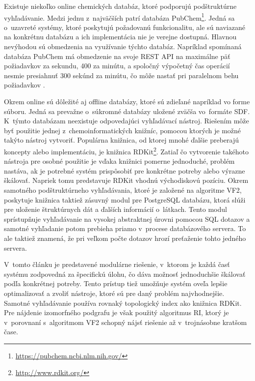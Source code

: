 \documentclass[slovak]{ExcelAtFIT} %
\begin{document}
Existuje niekoľko online chemických databáz, kto\-ré podporujú podštruktúrne vyhľadávanie. Medzi jednu z~najväčších patrí databáza PubChem\footnote{\url{https://pubchem.ncbi.nlm.nih.gov/}}. Jedná sa o~uzavreté systémy, ktoré poskytujú požadovanú funkcionalitu, ale sú naviazané na konkrétnu databázu a ich implementácia nie je verejne dostupná. Hlavnou ne\-vý\-ho\-dou sú obmedzenia na využívanie týchto databáz. Napríklad spomínaná databáza PubChem má obmedzenie na svoje REST API na maximálne päť požiadavkov za sekundu, 400 za minútu, a spoločný výpočetný čas operácií nesmie presiahnuť 300 sekúnd za minútu, čo môže nastať pri paralelnom behu po\-žia\-dav\-kov \cite{pubchem_limits}. 

Okrem online sú dôležité aj offline databázy, ktoré sú zdieľané napríklad vo forme súboru. Jedná sa pre\-va\-žne o~súkromné databázy uložené zväčša vo~formáte SDF. K~týmto databázam neexistuje odpovedajúci vy\-hľa\-dá\-va\-cí nástroj. Riešením môže byť použitie jednej z~chemoinformatických knižníc, pomocou ktorých je možné takýto nástroj vytvoriť. Populárna knižnica, od ktorej mnohé ďalšie preberajú koncepty alebo implementáciu, je knižnica RDKit\footnote{\url{http://www.rdkit.org/}}. Zatiaľ čo vytvorenie takéhoto ná\-stro\-ja pre osobné použitie je vďaka knižnici pomerne jednoduché, problém nastáva, ak je potrebné systém pri\-spô\-so\-biť pre konkrétne potreby alebo výrazne šká\-lo\-vať. Napriek tomu predstavuje RDKit vhodnú východiskovú pozíciu. Okrem samotného podštruktúrneho vy\-hľa\-dá\-va\-nia, ktoré je založené na algoritme VF2, poskytuje knižnica taktiež zásuvný modul pre PostgreSQL databázu, ktorá slúži pre uloženie štruktúrnych dát a ďalších informácií o~látkach. Tento modul sprístupňuje vy\-hľa\-dá\-va\-nie na vysokej abstraktnej úrovni pomocou SQL dotazov a samotné vyhľadanie potom prebieha priamo v~procese databázového servera. To ale taktiež znamená, že pri veľkom počte dotazov hrozí preťaženie tohto jedného servera.

V~tomto článku je predstavené modulárne riešenie, v~ktorom je každá časť systému zodpovedná za špe\-ci\-fi\-ckú úlohu, čo dáva možnosť jednoduchšie škálovať podľa konkrétnej potreby. Tento prístup tiež umožňuje systém oveľa lepšie optimalizovať a zvoliť nástroje, ktoré sú pre daný problém najvhodnejšie. Samotné vyhľadávanie používa rovnaký topologický index ako knižnica RDKit. Pre nájdenie izomorfného podgrafu je však použitý algoritmus RI, ktorý je v~porovnaní s~algoritmom VF2 schopný nájsť riešenie až v~trojnásobne kratšom čase. 
\end{document}
